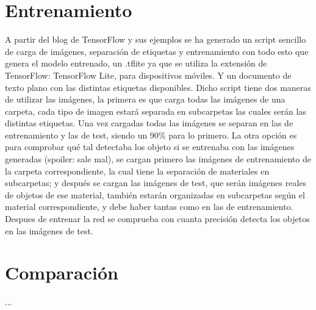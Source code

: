 \section{Entrenamiento}
\label{cap4:sec:entrenamiento}

A partir del blog de TensorFlow y sus ejemplos se ha generado un script sencillo de carga de imágenes, separación de etiquetas y entrenamiento con todo esto que genera el modelo entrenado, un .tflite ya que se utiliza la extensión de TensorFlow: TensorFlow Lite, para dispositivos móviles. Y un documento de texto plano con las distintas etiquetas disponibles.
Dicho script tiene dos maneras de utilizar las imágenes, la primera es que carga todas las imágenes de una carpeta, cada tipo de imagen estará separada en subcarpetas las cuales serán las distintas etiquetas. Una vez cargadas todas las imágenes se separan en las de entrenamiento y las de test, siendo un 90\% para lo primero.
La otra opción es para comprobar qué tal detectaba los objeto si se entrenaba con las imágenes generadas (spoiler: sale mal), se cargan primero las imágenes de entrenamiento de la carpeta correspondiente, la cual tiene la separación de materiales en subcarpetas; y después se cargan las imágenes de test, que serán imágenes reales de objetos de ese material, también estarán organizadas en subcarpetas según el material correspondiente, y debe haber tantas como en las de entrenamiento. Despues de entrenar la red se comprueba con cuanta precisión detecta los objetos en las imágenes de test.

\section{Comparación}
\label{cap4:sec:comparación}


...

\section*{\NotasBibliograficas}
\TocNotasBibliograficas


